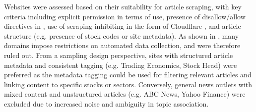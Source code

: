 Websites were assessed based on their suitability for article scraping, with key criteria including explicit permission in terms of use, presence of disallow/allow directives in , use of scraping inhibiting in the form of Cloudflare \cite{does_it_use_cloudflare}, and article structure (e.g. presence of stock codes or site metadata). As shown in , many domains impose restrictions on automated data collection, and were therefore ruled out. From a sampling design perspective, sites with structured article metadata and consistent tagging (e.g. Trading Economics, Stock Head) were preferred as the metadata tagging could be used for filtering relevant articles and linking content to specific stocks or sectors. Conversely, general news outlets with mixed content and unstructured articles (e.g. ABC News, Yahoo Finance) were excluded due to increased noise and ambiguity in topic association.


